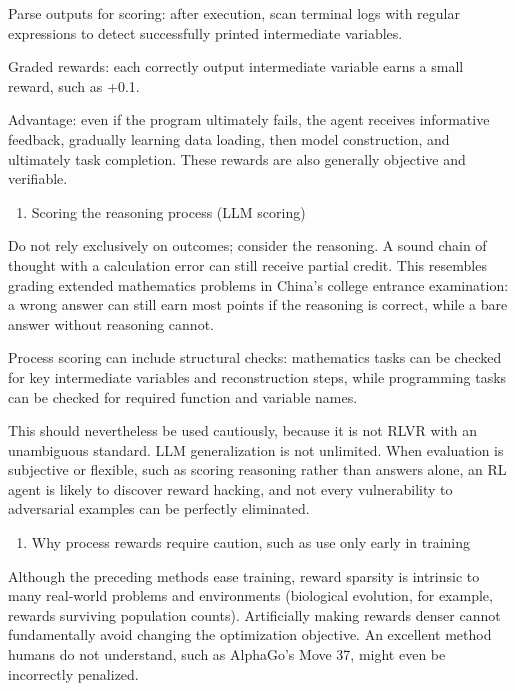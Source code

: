 Parse outputs for scoring: after execution, scan terminal logs with regular expressions to detect successfully printed intermediate variables.

Graded rewards: each correctly output intermediate variable earns a small reward, such as +0.1.

Advantage: even if the program ultimately fails, the agent receives informative feedback, gradually learning data loading, then model construction, and ultimately task completion. These rewards are also generally objective and verifiable.

\begin{enumerate}
\def\labelenumi{(\arabic{enumi})}
\setcounter{enumi}{1}
\tightlist
\item
  Scoring the reasoning process (LLM scoring)
\end{enumerate}

Do not rely exclusively on outcomes; consider the reasoning. A sound chain of thought with a calculation error can still receive partial credit. This resembles grading extended mathematics problems in China's college entrance examination: a wrong answer can still earn most points if the reasoning is correct, while a bare answer without reasoning cannot.

Process scoring can include structural checks: mathematics tasks can be checked for key intermediate variables and reconstruction steps, while programming tasks can be checked for required function and variable names.

This should nevertheless be used cautiously, because it is not RLVR with an unambiguous standard. LLM generalization is not unlimited. When evaluation is subjective or flexible, such as scoring reasoning rather than answers alone, an RL agent is likely to discover reward hacking, and not every vulnerability to adversarial examples can be perfectly eliminated.

\begin{enumerate}
\def\labelenumi{\arabic{enumi}.}
\setcounter{enumi}{1}
\tightlist
\item
  Why process rewards require caution, such as use only early in training
\end{enumerate}

Although the preceding methods ease training, reward sparsity is intrinsic to many real-world problems and environments (biological evolution, for example, rewards surviving population counts). Artificially making rewards denser cannot fundamentally avoid changing the optimization objective. An excellent method humans do not understand, such as AlphaGo's Move 37, might even be incorrectly penalized.

